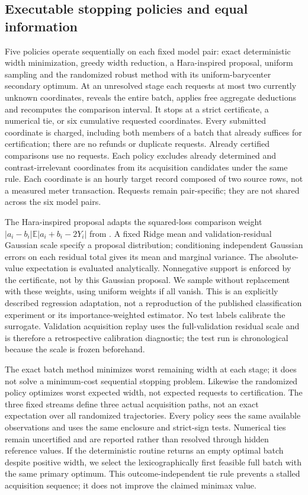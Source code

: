 \subsection{Executable stopping policies and equal information}\label{sec:external-policies}
Five policies operate sequentially on each fixed model pair: exact
deterministic width minimization, greedy width reduction, a Hara-inspired
proposal, uniform sampling and the randomized robust method with its
uniform-barycenter secondary optimum. At an unresolved stage each requests
at most two currently unknown coordinates, reveals the entire batch, applies
free aggregate deductions and recomputes the comparison interval. It stops
at a strict certificate, a numerical tie, or six cumulative requested
coordinates. Every submitted coordinate is charged, including both members
of a batch that already suffices for certification; there are no refunds or
duplicate requests. Already certified comparisons use no requests. Each
policy excludes already determined and contrast-irrelevant coordinates
from its acquisition candidates under the same rule. Each
coordinate is an hourly target record composed of two source rows, not a
measured meter transaction. Requests remain pair-specific; they are not
shared across the six model pairs.

The Hara-inspired proposal adapts the squared-loss comparison weight
$|a_i-b_i|\mathbb{E}|a_i+b_i-2Y_i|$ from \cite{hara}. A fixed Ridge mean and
validation-residual Gaussian scale specify a proposal distribution;
conditioning independent Gaussian errors on each residual total gives its
mean and marginal variance. The absolute-value expectation is evaluated
analytically. Nonnegative support is enforced by the certificate, not by
this Gaussian proposal. We sample without replacement with these weights,
using uniform weights if all vanish. This is an explicitly described
regression adaptation, not a reproduction of the published classification
experiment or its importance-weighted estimator. No test labels calibrate
the surrogate. Validation acquisition replay uses the full-validation
residual scale and is therefore a retrospective calibration diagnostic;
the test run is chronological because the scale is frozen beforehand.

The exact batch method minimizes worst remaining width at each stage; it
does not solve a minimum-cost sequential stopping problem. Likewise the
randomized policy optimizes worst expected width, not expected requests to
certification. The three fixed streams define three actual acquisition
paths, not an exact expectation over all randomized trajectories. Every
policy sees the same available observations and uses the same enclosure and
strict-sign tests. Numerical ties remain uncertified and are reported rather
than resolved through hidden reference values.
If the deterministic routine returns an empty optimal batch despite positive
width, we select the lexicographically first feasible full batch with the
same primary optimum. This outcome-independent tie rule prevents a stalled
acquisition sequence; it does not improve the claimed minimax value.


